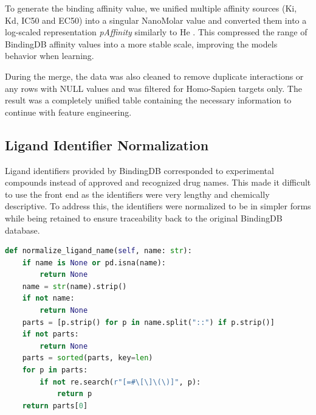 To generate the binding affinity value, we unified multiple affinity sources (Ki, Kd, IC50 and EC50) into a singular NanoMolar value and converted them into a log-scaled representation \textit{pAffinity} similarly to He \citep{He2017}. This compressed the range of BindingDB affinity values into a more stable scale, improving the models behavior when learning.

During the merge, the data was also cleaned to remove duplicate interactions or any rows with NULL values and was filtered for Homo-Sapien targets only. The result was a completely unified table containing the necessary information to continue with feature engineering. 

\subsection{Ligand Identifier Normalization}
Ligand identifiers provided by BindingDB corresponded to experimental compounds instead of approved and recognized drug names. This made it difficult to use the front end as the identifiers were very lengthy and chemically descriptive. To address this, the identifiers were normalized to be in simpler forms while being retained to ensure traceability back to the original BindingDB database.
\begin{lstlisting}[language=Python, caption={Ligand name normalisation from BindingDB identifiers}]
def normalize_ligand_name(self, name: str):
    if name is None or pd.isna(name):
        return None
    name = str(name).strip()
    if not name:
        return None
    parts = [p.strip() for p in name.split("::") if p.strip()]
    if not parts:
        return None
    parts = sorted(parts, key=len)
    for p in parts:
        if not re.search(r"[=#\[\]\(\)]", p):
            return p
    return parts[0]
\end{lstlisting}

